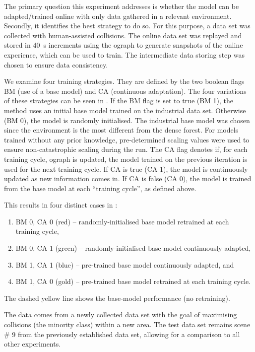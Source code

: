 The primary question this experiment addresses is whether the model can be adapted/trained online with only data gathered in a relevant environment. Secondly, it identifies the best strategy to do so. For this purpose, a data set was collected with human-assisted collisions. The online data set was replayed and stored in \qty{40}{\s} increments using the \ac{ograph} to generate snapshots of the online experience, which can be used to train. The intermediate data storing step was chosen to ensure data consistency.

We examine four training strategies. They are defined by the two boolean flags BM (use of a base model) and CA (continuous adaptation). The four variations of these strategies can be seen in . If the BM flag is set to true (BM 1), the method uses an initial base model trained on the industrial data set. Otherwise (BM 0), the model is randomly initialised. The industrial base model was chosen since the environment is the most different from the dense forest. For models trained without any prior knowledge, pre-determined scaling values were used to ensure non-catastrophic scaling during the run. The CA flag denotes if, for each training cycle, \ac{ograph} is updated, the model trained on the previous iteration is used for the next training cycle. If CA is true (CA 1), the model is continuously updated as new information comes in. If CA is false (CA 0), the model is trained from the base model at each ``training cycle'', as defined above.

This results in four distinct cases in :
\begin{enumerate}
 \item BM 0, CA 0 (red) -- randomly-initialised base model retrained at each training cycle,
 \item BM 0, CA 1 (green) -- randomly-initialised base model continuously adapted,
 \item BM 1, CA 1 (blue) -- pre-trained base model continuously adapted, and
 \item BM 1, CA 0 (gold) -- pre-trained base model retrained at each training cycle.
 \end{enumerate}
The dashed yellow line shows the base-model performance (no retraining).

The data comes from a newly collected data set with the goal of maximising collisions (the minority class) within a new area. The test data set remains scene \# 9 from the previously established data set, allowing for a comparison to all other experiments.

